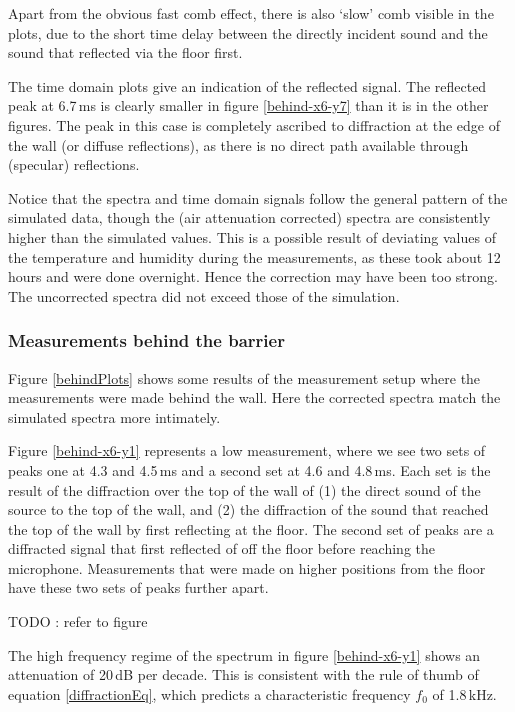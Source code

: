 Apart from the obvious fast comb effect, there is also `slow' comb visible in the plots, due to the short time delay between the directly incident sound and the sound that reflected via the floor first.

The time domain plots give an indication of the reflected signal. The reflected peak at 6.7\,ms is clearly smaller in figure \ref{behind-x6-y7} than it is in the other figures. The peak in this case is completely ascribed to diffraction at the edge of the wall (or diffuse reflections), as there is no direct path available through (specular) reflections.

Notice that the spectra and time domain signals follow the general pattern of the simulated data, though the (air attenuation corrected) spectra are consistently higher than the simulated values. This is a possible result of deviating values of the temperature and humidity during the measurements, as these took about 12 hours and were done overnight. Hence the correction may have been too strong. The uncorrected spectra did not exceed those of the simulation.



\subsubsection*{Measurements behind the barrier}

Figure \ref{behindPlots} shows some results of the measurement setup where the measurements were made behind the wall. Here the corrected spectra match the simulated spectra more intimately.

Figure \ref{behind-x6-y1} represents a low measurement, where we see two sets of peaks one at 4.3 and 4.5\,ms and a second set at 4.6 and 4.8\,ms. Each set is the result of the diffraction over the top of the wall of (1) the direct sound of the source to the top of the wall, and (2) the diffraction of the sound that reached the top of the wall by first reflecting at the floor. The second set of peaks are a diffracted signal that first reflected of off the floor before reaching the microphone. Measurements that were made on higher positions from the floor have these two sets of peaks further apart.

TODO : refer to figure

The high frequency regime of the spectrum in figure \ref{behind-x6-y1} shows an attenuation of 20\,dB per decade. This is consistent with the rule of thumb of equation \ref{diffractionEq}, which predicts a characteristic frequency $f_0$ of 1.8\,kHz.

